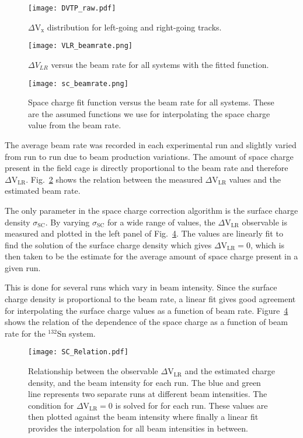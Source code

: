 \begin{figure}[!htb]
\centering
\texttt{[image: DVTP\_raw.pdf]}
\caption{$\Delta\mathrm{V}_\mathrm{x}$ distribution for left-going and right-going tracks. }
\label{fig:VLR}
\end{figure}



\begin{figure}[!htb]
\centering
\texttt{[image: VLR\_beamrate.png]}
\caption{ $\Delta V_{LR}$ versus the beam rate for all systems with the fitted function.}
\label{fig:VLR_br}
\end{figure}



\begin{figure}[!htb]
\centering
\texttt{[image: sc\_beamrate.png]}
\caption{Space charge fit function versus the beam rate for all systems. These are the assumed functions we use for interpolating the space charge value from the beam rate.}
\label{fig:spacechg_br_all}
\end{figure}

The average beam rate was recorded in each experimental run and slightly varied from run to run due to beam production variations. The amount of space charge present in the field cage is directly proportional to the beam rate and therefore $\Delta\mathrm{V}_\mathrm{LR}$.  Fig.~\ref{fig:VLR_br} shows the relation between the measured $\Delta\mathrm{V}_\mathrm{LR}$ values and the estimated beam rate. 

The only parameter in the space charge correction algorithm is the surface charge density $\sigma_{\mathrm{SC}}$. By varying $\sigma_{\mathrm{SC}}$ for a wide range of values, the $\Delta\mathrm{V}_\mathrm{LR}$ observable is measured and plotted in the left panel of Fig.~\ref{fig:spacechg_relation}. The values are linearly fit to find the solution of the surface charge density which gives $\Delta\mathrm{V}_\mathrm{LR} = 0$, which is then taken to be the estimate for the average amount of space charge present in a given run.

This is done for several runs which vary in beam intensity. Since the surface charge density is proportional to the beam rate, a linear fit gives good agreement for interpolating the surface charge values as a function of beam rate. Figure~\ref{fig:spacechg_relation} shows the relation of the dependence of the space charge as a function of beam rate for the ${}^{132}$Sn system.

\begin{figure}[!htb]
\texttt{[image: SC\_Relation.pdf]}
\caption{Relationship between the observable  $\Delta\mathrm{V}_\mathrm{LR}$ and the estimated charge density, and the beam intensity for each run. The blue and green line represents two separate runs at different beam intensities. The condition for  $\Delta\mathrm{V}_\mathrm{LR} = 0$ is solved for for each run. These values are then plotted against the beam intensity where finally a linear fit provides the interpolation for all beam intensities in between.}
\label{fig:spacechg_relation}
\end{figure}


